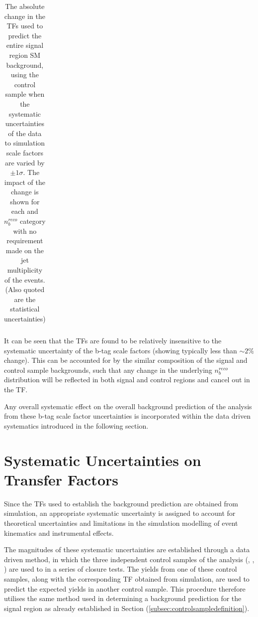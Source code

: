 \begin{table}[ht!]
\begin{center}
\begin{tabular*}{0.95\textwidth}{@{\extracolsep{\fill}} ccccc}
\end{tabular*}
\end{center}
\caption[The absolute change in the \ac{TF}s used to predict the entire signal region \ac{SM} background, using the \mupjets control sample when the systematic uncertainties of the data to simulation scale factors are varied by $\pm 1 \sigma$.]{The absolute change in the \ac{TF}s used to predict the entire signal region \ac{SM} background, using the \mupjets control sample when the systematic uncertainties of the data to simulation scale factors are varied by $\pm 1 \sigma$. The impact of the change is shown for each \theht and $n_{b}^{reco}$ category with no requirement made on the jet multiplicity of the events. (Also quoted are the statistical uncertainties)}\label{tab:btagsfuncertainties}
\end{table}
\def\arraystretch{1.0}

It can be seen that the \ac{TF}s are found to be relatively insensitive to the systematic uncertainty of the b-tag scale factors (showing typically less than $\sim2\%$ change). This can be accounted for by the similar composition of the signal and control sample backgrounds, such that any change in the underlying $n_{b}^{reco}$ distribution will be reflected in both signal and control regions and cancel out in the \ac{TF}. 

Any overall systematic effect on the overall background prediction of the analysis from these b-tag scale factor uncertainties is incorporated within the data driven systematics introduced in the following section.

\section{Systematic Uncertainties on Transfer Factors}
\label{subsec:sysuncertainties}

Since the \ac{TF}s used to establish the background prediction are obtained from simulation, an appropriate systematic uncertainty is assigned to account for theoretical uncertainties and limitations in the simulation modelling of event kinematics and instrumental effects. 

The magnitudes of these systematic uncertainties are established through a data driven method, in which the three independent control samples of the analysis (\mupjets, \dimupjets, \gpjets) are used to in a series of closure tests. The yields from one of these control samples, along with the corresponding \ac{TF} obtained from simulation, are used to predict the expected yields in another control sample. This procedure therefore utilises the same method used in determining a background prediction for the signal region as already established in Section (\ref{subsec:controlsampledefinition}).

